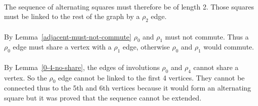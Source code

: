 \paragraph{}
The sequence of alternating squares must therefore be of length 2. Those squares must be linked to the rest of the graph by a $\rho_2$ edge.

\begin{figure}[H]
  \begin{center}
    \caption{}
  \end{center}
\end{figure}


\paragraph{}
By Lemma~\ref{adjacent-must-not-commute} $\rho_0$ and $\rho_1$ must not commute. Thus a $\rho_0$ edge must share a vertex with a $\rho_1$ edge, otherwise $\rho_0$ and $\rho_1$ would commute.

\paragraph{}
By Lemma~\ref{0-4-no-share}, the edges of involutions $\rho_0$ and $\rho_4$ cannot share a vertex. So the $\rho_0$ edge cannot be linked to the first 4 vertices. They cannot be connected thus to the 5th and 6th vertices because it would form an alternating square but it was proved that the sequence cannot be extended.

